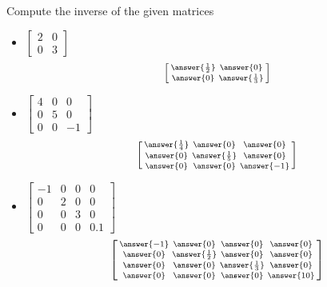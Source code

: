 \documentclass{ximera}
\begin{document}
\begin{exercise}%
    Compute the inverse of the given matrices
    \begin{itemize}
        \item
        $\begin{bmatrix}
            2 & 0 \\
            0 & 3 
        \end{bmatrix}$
        \[
            \left[\begin{smallmatrix} \answer{\frac{1}{2}} & \answer{0} \\ \answer{0} & \answer{\frac{1}{3}} \end{smallmatrix}\right]
        \]
        \item
        $\begin{bmatrix}
            4 & 0 & 0 \\
            0 & 5 & 0 \\ 
            0 & 0 & -1
        \end{bmatrix}$
        \[
            \left[\begin{smallmatrix} \answer{\frac{1}{4}} & \answer{0} & \answer{0} \\ \answer{0} & \answer{\frac{1}{5}} & \answer{0} \\  \answer{0} & \answer{0} & \answer{-1} \end{smallmatrix}\right]
        \]
        \item
        $\begin{bmatrix}
            -1 & 0 & 0 & 0 \\
            0 & 2 & 0 & 0 \\ 
            0 & 0 & 3 & 0 \\
            0 & 0 & 0 & 0.1
        \end{bmatrix}$
        \[
            \left[\begin{smallmatrix} \answer{-1} & \answer{0} & \answer{0} & \answer{0} \\ \answer{0} & \answer{\frac{1}{2}} & \answer{0} & \answer{0} \\  \answer{0} & \answer{0} & \answer{\frac{1}{3}} & \answer{0} \\ \answer{0} & \answer{0} & \answer{0} & \answer{10} \end{smallmatrix}\right]
        \]
    \end{itemize}
\end{exercise}
\end{document}
